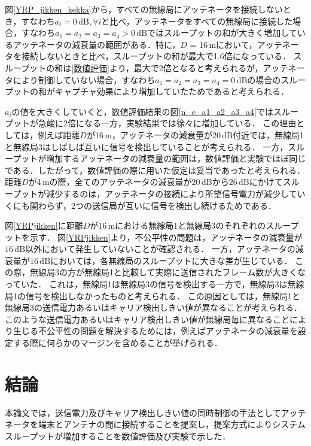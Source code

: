 \documentclass[master]{kuisthesis}		%
\begin{document}
図\ref{YRP_jikken_kekka}から，すべての無線局にアッテネータを接続しないとき，すなわち$a_i = 0\,\mathrm{dB}, \forall i$と比べ，アッテネータをすべての無線局に接続した場合，すなわち$a_1 = a_2 = a_3 = a_4 > 0\,\mathrm{dB}$ではスループットの和が大きく増加しているアッテネータの減衰量の範囲がある．特に，$D$ = 16\,mにおいて，アッテネータを接続しないときと比べ，スループットの和が最大で1.6倍になっている．
スループットの和は\ref{数値評価}より，最大で2倍となると考えられるが，アッテネータにより制御していない場合，すなわち$a_1 = a_2 = a_3 = a_4 = 0\,\mathrm{dB}$の場合のスループットの和がキャプチャ効果により増加していたためであると考えられる．

$a_i$の値を大きくしていくと，数値評価結果の図\ref{n_e_a1_a2_a3_a4}ではスループットが急峻に2倍になる一方，実験結果では徐々に増加している．
この理由としては，例えば距離$D$が16\,m，アッテネータの減衰量が$20\,\mathrm{dB}$付近では，無線局1と無線局3はしばしば互いに信号を検出していることが考えられる．%
一方，スループットが増加するアッテネータの減衰量の範囲は，数値評価と実験でほぼ同じである．したがって，数値評価の際に用いた仮定は妥当であったと考えられる．
距離$D$が4\,mの際，全てのアッテネータの減衰量が$20\,\mathrm{dB}$から$26\,\mathrm{dB}$にかけてスループットが減少するのは，アッテネータの接続により所望信号電力が減少していくにも関わらず，2つの送信局が互いに信号を検出し続けるためである．


図\ref{YRPjikken}に距離$D$が16\,mにおける無線局1と無線局3のそれぞれのスループットを示す．
図\ref{YRPjikken}より，不公平性の問題は，アッテネータの減衰量が$16\,\mathrm{dB}$以外において発生していないことが確認される．
一方，アッテネータの減衰量が$16\,\mathrm{dB}$においては，各無線局のスループットに大きな差が生じている．
この際，無線局3の方が無線局1と比較して実際に送信されたフレーム数が大きくなっていた．
これは，無線局1は無線局3の信号を検出する一方で，無線局3は無線局1の信号を検出しなかったものと考えられる．
この原因としては，無線局1と無線局3の送信電力あるいはキャリア検出しきい値が異なることが考えられる．
このような送信電力あるいはキャリア検出しきい値が無線局毎に異なることにより生じる不公平性の問題を解決するためには，例えばアッテネータの減衰量を設定する際に何らかのマージンを含めることが挙げられる．


\section{結論} \label{結論}
本論文では，送信電力及びキャリア検出しきい値の同時制御の手法としてアッテネータを端末とアンテナの間に接続することを提案し，提案方式によりシステムスループットが増加することを数値評価及び実験で示した．
\end{document}
